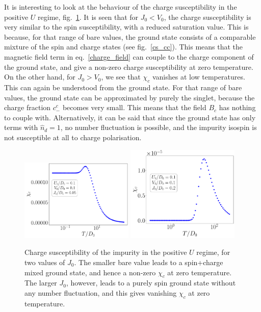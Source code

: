 \documentclass{report}
\numberwithin{equation}{section}
\begin{document}
It is interesting to look at the behaviour of the charge susceptibility in the positive \(U\) regime, fig.~\ref{chi_charge_posU}. It  is seen that for \(J_0<V_0\), the charge susceptibility is very similar to the spin susceptibility, with a reduced saturation value. This is because, for that range of bare values, the ground state consists of a comparable mixture of the spin and charge states (see fig.~\ref{cs_cc}). This means that the magnetic field term in eq.~\eqref{charge_field} can couple to the charge component of the ground state, and give a non-zero charge susceptibility at zero temperature. On the other hand, for \(J_0 > V_0\), we see that \(\chi_c\) vanishes at low temperatures. This can again be understood from the ground state. For that range of bare values, the ground state can be approximated by purely the singlet, because the charge fraction \(c_-^c\) becomes very small. This means that the field \(B_c \) has nothing to couple with. Alternatively, it can be said that since the ground state has only terms with \(\hat n_d=1\), no number fluctuation is possible, and the impurity isospin is not susceptible at all to charge polarisation.
\begin{figure}[htpb]
	\centering
	\includegraphics[width=0.48\textwidth]{../figures/chiC_posU_J0=10.pdf}
	\includegraphics[width=0.48\textwidth]{../figures/chiC_posU_J0=40.pdf}
	\caption{Charge susceptibility of the impurity in the positive \(U\) regime, for two values of \(J_0\). The smaller bare value leads to a spin+charge mixed ground state, and hence a non-zero \(\chi_c\) at zero temperature. The larger \(J_0\), however, leads to a purely spin ground state without any number fluctuation, and this gives vanishing \(\chi_c\) at zero temperature.}
	\label{chi_charge_posU}
\end{figure}
\end{document}
